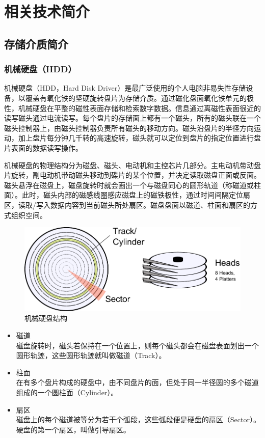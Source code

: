 
\chapter{相关技术简介}
\label{cha:related_work}

\section{存储介质简介}

\subsection{机械硬盘（HDD）}
机械硬盘（HDD，Hard Disk Driver）是最广泛使用的个人电脑非易失性存储设备，以覆盖有氧化铁的坚硬旋转盘片为存储介质。通过磁化盘面氧化铁单元的极性，机械硬盘在平整的磁性表面存储和检索数字数据。信息通过离磁性表面很近的读写磁头通过电流读写。每个盘片的存储面上都有一个磁头，所有的磁头联在一个磁头控制器上，由磁头控制器负责所有磁头的移动方向。磁头沿盘片的半径方向运动，加上盘片每分钟几千转的高速旋转，磁头就可以定位到盘片的指定位置进行盘片表面的数据读写操作。

机械硬盘的物理结构分为磁盘、磁头、电动机和主控芯片几部分。主电动机带动盘片旋转，副电动机带动磁头移动到碟片的某个位置，并决定读取磁盘正面或反面。磁头悬浮在磁盘上，磁盘旋转时就会画出一个与磁盘同心的圆形轨道（称磁道或柱面）。此时，磁头内部的磁感线圈感应磁盘上的磁铁极性，通过时间间隔定位扇区，读取/写入数据内容到当前磁头所处扇区。磁盘盘面以磁道、柱面和扇区的方式组织空间。

\begin{figure}[H]
\centering
\includegraphics[width=0.6\linewidth]{./graph/hdd-struct}
\caption{机械硬盘结构}
\label{fig:hdd-struct}
\end{figure}

\begin{itemize}
\item 磁道
\\磁盘旋转时，磁头若保持在一个位置上，则每个磁头都会在磁盘表面划出一个圆形轨迹，这些圆形轨迹就叫做磁道（Track）。
\item 柱面
\\在有多个盘片构成的硬盘中，由不同盘片的面，但处于同一半径圆的多个磁道组成的一个圆柱面（Cylinder）。
\item 扇区
\\磁盘上的每个磁道被等分为若干个弧段，这些弧段便是硬盘的扇区（Sector）。硬盘的第一个扇区，叫做引导扇区。
\end{itemize}


